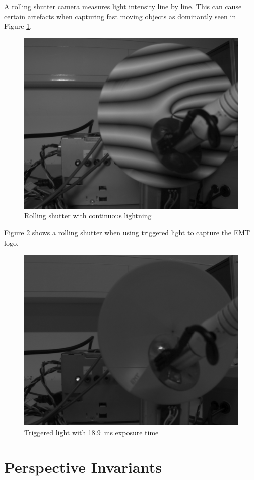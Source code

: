 \documentclass[
a4paper,     %
12pt         %
]{scrartcl}  %
\begin{document}
A rolling shutter camera measures light intensity line by line.
This can cause certain artefacts when capturing fast moving objects as dominantly seen in Figure \ref{fig:rolling_shuter_cont_light}.

\begin{figure}[H]
 \centering
 \includegraphics[width=.6\linewidth]{./Bildg_Messtechnik_Lab/SensorDynamics/rolling_shuter_cont_light.png}
 \caption{Rolling shutter with continuous lightning}
 \label{fig:rolling_shuter_cont_light}
\end{figure}

Figure \ref{fig:triggered_light_rolling_shutter} shows a rolling shutter when using triggered light to capture the EMT logo.

\begin{figure}[H]
 \centering
 \includegraphics[width=.6\linewidth]{./Bildg_Messtechnik_Lab/SensorDynamics/triggered_light_rolling_shutter.png}
 \caption{Triggered light with \SI{18.9}{ms} exposure time}
 \label{fig:triggered_light_rolling_shutter}
\end{figure}


\pagebreak
\section{Perspective Invariants}
\end{document}
